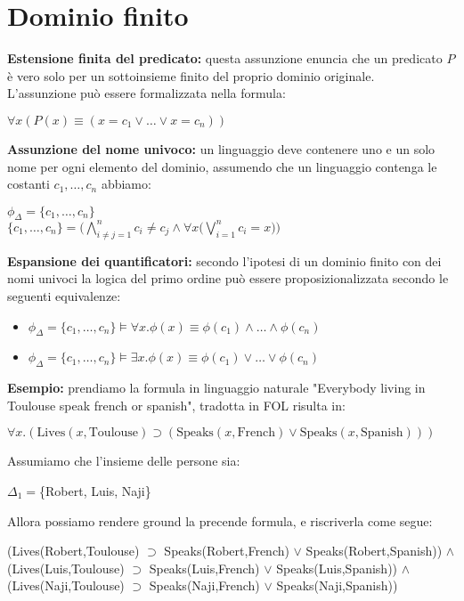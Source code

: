 \documentclass[../main.tex]{subfiles}
\begin{document}
   \section{Dominio finito}
   \textbf{Estensione finita del predicato:} questa assunzione enuncia che un predicato $P$ è vero solo per un sottoinsieme finito del proprio dominio originale.\\
   L'assunzione può essere formalizzata nella formula:
   \begin{center}
      $\forall x(P(x) \equiv (x=c_1 \lor \dots \lor x=c_n))$
   \end{center}
   \textbf{Assunzione del nome univoco:} un linguaggio deve contenere uno e un solo nome per ogni elemento del dominio, assumendo che un linguaggio contenga le costanti $c_1, \dots , c_n$ abbiamo:
   \begin{center}
      $\phi_\Delta = \{ c_1, \dots , c_n \}$\\
      \vspace{4ex}
      $\{ c_1, \dots , c_n \} = \biggl( \bigwedge_{i \neq j=1}^{n} c_i \neq c_j \land \forall x \biggl( \bigvee_{i=1}^{n} c_i=x \biggr) \biggr)$
   \end{center}
   \textbf{Espansione dei quantificatori:} secondo l'ipotesi di un dominio finito con dei nomi univoci la logica del primo ordine può essere proposizionalizzata secondo le seguenti equivalenze:
   \begin{itemize}
      \item $\phi_\Delta = \{ c_1, \dots , c_n \} \models \forall x.\phi(x) \equiv \phi(c_1) \land \dots \land \phi(c_n)$
      \item $\phi_\Delta = \{ c_1, \dots , c_n \} \models \exists x.\phi(x) \equiv \phi(c_1) \lor \dots \lor \phi(c_n)$
   \end{itemize}
   \textbf{Esempio:} prendiamo la formula in linguaggio naturale "Everybody living in Toulouse speak french or spanish", tradotta in FOL risulta in:
   \begin{center}
      $\forall x.( \text{Lives}( x,\text{Toulouse} ) \supset ( \text{Speaks}( x,\text{French} ) \lor \text{Speaks}( x,\text{Spanish} ) ) )$
   \end{center}
   Assumiamo che l'insieme delle persone sia:
   \begin{center}
      $\Delta_1=$\{Robert, Luis, Naji\}
   \end{center}
   Allora possiamo rendere ground la precende formula, e riscriverla come segue:
   \begin{center}
      (Lives(Robert,Toulouse) $\supset$ Speaks(Robert,French) $\lor$ Speaks(Robert,Spanish)) $\land$\\
      (Lives(Luis,Toulouse) $\supset$ Speaks(Luis,French) $\lor$ Speaks(Luis,Spanish)) $\land$\\
      (Lives(Naji,Toulouse) $\supset$ Speaks(Naji,French) $\lor$ Speaks(Naji,Spanish)) 
   \end{center}
\end{document}
